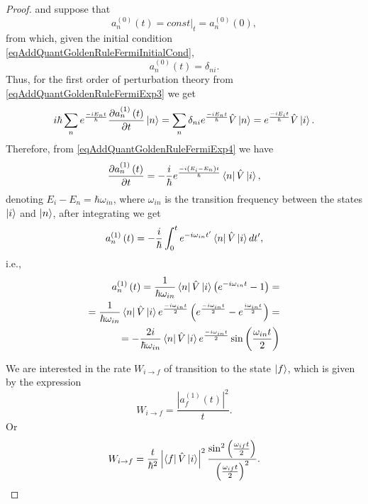 \begin{proof}
  and suppose that
  \[
  a_n^{(0)}\left(t\right) = \left.const\right|_t = a_n^{(0)}\left(0\right),
  \]
  from which, given the initial condition
  \eqref{eqAddQuantGoldenRuleFermiInitialCond},
  \[
  a_n^{(0)}\left(t\right) = \delta_{ni}.
  \]
  Thus, for the first order of perturbation theory from
  \eqref{eqAddQuantGoldenRuleFermiExp3} we get
  \begin{eqnarray}
    i \hbar \sum_n  e^{\frac{-i E_n t}{\hbar}}
    \frac{ \partial a_n^{(1)}\left(t\right)}{\partial t } \ket{n} =
     \sum_n  \delta_{ni} 
     e^{\frac{-i E_n t}{\hbar}} \hat{V} \ket{n} =
     e^{\frac{-i E_i t}{\hbar}} \hat{V} \ket{i}.
    \label{eqAddQuantGoldenRuleFermiExp4}
  \end{eqnarray}
  Therefore, from \eqref{eqAddQuantGoldenRuleFermiExp4} we have
  \begin{equation}
    \frac{ \partial a_n^{(1)}\left(t\right)}{\partial t }  =
    - \frac{i}{\hbar} e^{\frac{-i \left(E_i - E_n\right) t}{\hbar}}
    \bra{n}\hat{V}\ket{i},
    \nonumber
  \end{equation}
  denoting $E_i - E_n = \hbar \omega_{in}$, where $\omega_{in}$
  is the transition frequency between the states $\ket{i}$ and
  $\ket{n}$, after integrating we get
  \begin{equation}
  a_n^{(1)}\left(t\right)  =
    - \frac{i}{\hbar} \int_0^t e^{-i \omega_{in} t'}
    \bra{n}\hat{V}\ket{i} dt',
    \nonumber
  \end{equation}
  i.e.,
  \begin{eqnarray}
  a_n^{(1)}\left(t\right)  =
  \frac{1}{\hbar \omega_{in}} \bra{n}\hat{V}\ket{i}
  \left(e^{-i \omega_{in} t} -  1\right) =
  \\ \nonumber =
  \frac{1}{\hbar \omega_{in}} \bra{n}\hat{V}\ket{i}
  e^{\frac{-i \omega_{in} t}{2}}
  \left(e^{\frac{-i \omega_{in} t}{2}} -  e^{\frac{i \omega_{in}
      t}{2}}\right) =
  \\ \nonumber
  =
  - \frac{2 i}{\hbar \omega_{in}} \bra{n}\hat{V}\ket{i}
  e^{\frac{-i \omega_{in} t}{2}}
  \sin\left(\frac{ \omega_{in} t}{2}\right)
  \nonumber
  \end{eqnarray}
  
  
  We are interested in the rate $W_{i \rightarrow f}$ of transition to
  the state $\ket{f}$, which is given by the expression
  \[
  W_{i \rightarrow f} = \frac{\left|a_f^{(1)}\left(t\right)\right|^2}{t}.
  \]
  Or
  \begin{eqnarray}
    W_{i \rightarrow f} =
    \frac{t}{\hbar^2}
    \left|\bra{f}\hat{V}\ket{i}\right|^2
    \frac{\sin^2\left(\frac{ \omega_{if} t}{2}\right)}
         {\left(\frac{ \omega_{if} t}{2}\right)^2}.
    \label{eqAddQuantGoldenRuleFermiExp5}
  \end{eqnarray}


\end{proof}
